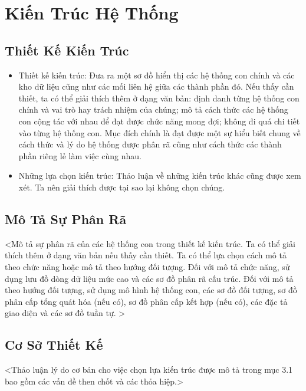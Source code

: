 
\clearpage

\section{Kiến Trúc Hệ Thống}

\subsection{Thiết Kế Kiến Trúc}
\begin{itemize}
  \item Thiết kế kiến trúc: Đưa ra một sơ đồ hiển thị các hệ thống con chính và các kho dữ liệu 
cũng như các mối liên hệ giữa các thành phần đó. Nếu thấy cần thiết, ta có thể giải thích 
thêm ở dạng văn bản: định danh từng hệ thống con chính và vai trò hay trách nhiệm của 
chúng; mô tả cách thức các hệ thống con cộng tác với nhau để đạt được chức năng mong 
đợi; không đi quá chi tiết vào từng hệ thống con. Mục đích chính là đạt được một sự hiểu 
biết chung về cách thức và lý do hệ thống được phân rã cũng như cách thức các thành 
phần riêng lẻ làm việc cùng nhau. 
  \item Những lựa chọn kiến trúc: Thảo luận về những kiến trúc khác cũng được xem xét. Ta nên 
giải thích được tại sao lại không chọn chúng.
\end{itemize}

\subsection{Mô Tả Sự Phân Rã}
\noindent <Mô tả sự phân rã của các hệ thống con trong thiết kế kiến trúc. Ta có thể giải thích thêm ở dạng 
văn bản nếu thấy cần thiết. Ta có thể lựa chọn cách mô tả theo chức năng hoặc mô tả theo hướng 
đối tượng. Đối với mô tả chức năng, sử dụng lưu đồ dòng dữ liệu mức cao và các sơ đồ phân rã 
cấu trúc. Đối với mô tả theo hướng đối tượng, sử dụng mô hình hệ thống con, các sơ đồ đối 
tượng, sơ đồ phân cấp tổng quát hóa (nếu có), sơ đồ phân cấp kết hợp (nếu có), các đặc tả giao 
diện và các sơ đồ tuần tự. >

\subsection{Cơ Sở Thiết Kế}
<Thảo luận lý do cơ bản cho việc chọn lựa kiến trúc được mô tả trong mục 3.1 bao gồm các vấn 
đề then chốt và các thỏa hiệp.> 